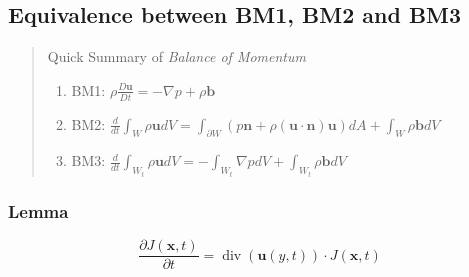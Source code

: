 \subsection{Equivalence between BM1, BM2 and BM3} %


\begin{quote}
	Quick Summary of \textit{Balance of Momentum}
\begin{enumerate}
	\item BM1: $\displaystyle \rho \frac{D\textbf{u}}{Dt} = -\nabla p + \rho \textbf{b}$
	\item BM2: $\displaystyle \frac{d}{dt}\int_{W}\rho \textbf{u} dV = \int_{\partial W} \left(p\textbf{n} + \rho (\textbf{u}\cdot \textbf{n})\textbf{u}\right) dA + \int_{W} \rho \textbf{b} dV$
	\item BM3: $\displaystyle \frac{d}{dt} \int_{W_t} \rho \textbf{u} dV = -\int_{W_t} \nabla pdV + \int_{W_t} \rho \textbf{b}dV$

\end{enumerate}

\end{quote}

\subsubsection{Lemma} %


\begin{equation}
\frac{\partial J(\textbf{x},t)}{\partial t} = \operatorname{div}(\textbf{u}(y,t)) \cdot J(\textbf{x},t)
\end{equation}


